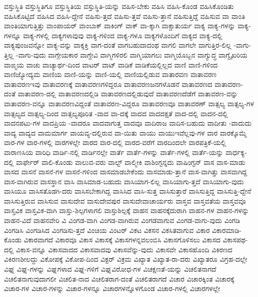{ವಸ್ತುಸ್ಥಿತಿ
ವಸ್ತುಸ್ಥಿತಿಗೂ
ವಸ್ತುಸ್ಥಿತಿಯ
ವಸ್ತುಸ್ಥಿತಿ-ಯನ್ನು
ವಹಿಸ-ಬೇಕು
ವಹಿಸಿ
ವಹಿಸಿ-ಕೊಂಡ
ವಹಿಸಿಕೊಂಡಿತು
ವಹಿಸಿಕೊಟ್ಟಿದೆ
ವಹಿಸಿದ
ವಹಿಸಿ-ದ್ದೇನೆ
ವಹಿಸು-ತ್ತದೆ
ವಹಿಸು-ತ್ತವೆ
ವಹಿಸು-ತ್ತಾನೆ
ವಹಿಸುತ್ತಿದ್ದೆ
ವಹಿಸುವ
ವಾ
ವಾಂತಿ
ವಾಂತಿಯಾಗುತ್ತಿತ್ತು
ವಾಂಪಾಯರ್
ವಾಂಬಾಕ್
ವಾಕಿಂಗ್
ವಾಕ್
ವಾ-ಕ್ಕಾಗಿ
ವಾಕ್ಚಾತುರ್ಯ
ವಾಕ್ಯ
ವಾಕ್ಯ-ಗಳನ್ನು
ವಾಕ್ಯ-ಗಳನ್ನೂ
ವಾಕ್ಯ-ಗಳಲ್ಲಿ
ವಾಕ್ಯಗಳಾವುವು
ವಾಕ್ಯ-ಗಳಿಂದ
ವಾಕ್ಯ-ಗಳೂ
ವಾಕ್ಯಗಳೊಂದಿಗೆ
ವಾಕ್ಯದ
ವಾಕ್ಯ-ದಲ್ಲಿ
ವಾಕ್ಯಪುಂಜವನ್ನೋ
ವಾಕ್ಯ-ವನ್ನು
ವಾಕ್ಶಕ್ತಿ
ವಾಗ-ದಂತೆ
ವಾಗಬಹುದಾದಂಥ
ವಾಗಲಿ
ವಾಗಲೇ
ವಾಗುತ್ತಿರ-ಲಿಲ್ಲ
-ವಾಗು-ತ್ತಿಲ್ಲ
-ವಾಗು-ವುದು
ವಾಗ್ಗೇಯಕಾರ
ವಾಗ್ದೇವಿ
ವಾಗ್ಮಿಗಳಿರಲಿ
ವಾಗ್ಮಿಯಾಗಲು
ವಾಗ್ಮಿಯೊಬ್ಬನ
ವಾಗ್ಯುದ್ಧ
ವಾಗ್ವೈಖರಿಯ
ವಾಙ್ಮಯ
ವಾಚು
ವಾಚ್ಯಾರ್ಥ-ದಿಂದ
ವಾಟರ್
ವಾಟ್
ವಾಡಿಕೆ
ವಾಡಿಕೆಯಲ್ಲಿಲ್ಲದ
ವಾಣಿ
ವಾಣಿ-ಗಳಿಂದ
ವಾಣಿಜ್ಯೋದ್ಯಮ
ವಾಣಿಯ
ವಾಣಿ-ಯನ್ನು
ವಾಣಿ-ಯಲ್ಲಿ
ವಾಣಿಯಲ್ಲಿಡುವ
ವಾತಾರವಣ
ವಾತಾವರಣ
ವಾತಾವರಣಇವು
ವಾತಾವರಣಕ್ಕೆ
ವಾತಾವರಣಗಳಿದ್ದರೂ
ವಾತಾವರಣಜನಗಳೊಡನೆ
ವಾತಾವರಣದ
ವಾತಾವರಣ-ದಂತೆ
ವಾತಾವರಣ-ದಲ್ಲಿ
ವಾತಾವರಣದಲ್ಲಿಡಿ
ವಾತಾವರಣದಲ್ಲಿಡುವುದೆ
ವಾತಾವರಣದೆಡೆಗೆ
ವಾತಾವರಣ-ವನ್ನು
ವಾತಾವರಣ-ವನ್ನೂ
ವಾತಾವರಣವಿದ್ದಂತೆ
ವಾತಾವರಣ-ವಿದ್ದರೂ
ವಾತಾವರಣವೂ
ವಾತಾವರಣ್
ವಾತ್ಸಲ್ಯ
ವಾತ್ಸಲ್ಯ-ಗಳ
ವಾತ್ಸಲ್ಯದ
ವಾತ್ಸಲ್ಯ-ದಿಂದ
ವಾತ್ಸಲ್ಯಪೂರಿತ
-ವಾದ
ವಾ-ದಕ್ಕೆ
ವಾದದ
ವಾದದಕ್ಷತೆ
ವಾದ-ದಲ್ಲಿ
ವಾದನ-ದಲ್ಲಿ
ವಾದನಪಟು-ಗಳ
ವಾದಪ್ರಿಯ
-ವಾದರೂ
ವಾದವಾಗುತ್ತ
ವಾದವೂ
ವಾದಿರಾಜ
ವಾದಿಸ-ಬಹುದು
ವಾದೀತು
-ವಾದುದು
ವಾದ್ಯ
ವಾದ್ಯದ
ವಾಮಮಾರ್ಗ
ವಾಯವ್ಯ-ದಲ್ಲಿರುವ
ವಾ-ಯಿತು
ವಾಯು
ವಾಯುಇವೆಲ್ಲವು-ಗಳ
ವಾರ
ವಾರಕ್ಕೊಮ್ಮೆ
ವಾರ-ಗಳ
ವಾರ-ಗಳಲ್ಲಿ
ವಾರಗಳಲ್ಲೇ
ವಾರದ
ವಾರ-ದಲ್ಲಿ
ವಾರದ-ವರೆಗೆ
ವಾರದಿಂದಲೇ
ವಾರಪತ್ರಿಕೆ-ಯಲ್ಲಿ
ವಾರಾಣಸಿಯ
ವಾರಿಧಿ
ವಾರ್ಡಿ-ನಲ್ಲಿ
ವಾರ್ಡಿನಲ್ಲೇ
ವಾರ್ತೆ
ವಾರ್ತೆ-ಗಳನ್ನು
ವಾರ್ತೆ-ಗಳಲ್ಲಿ
ವಾರ್ತೆ-ಯನ್ನು
ವಾರ್ಧಕ್ಯ-ದಲ್ಲಿ
ವಾರ್ಫೇರ್
ವಾಲಿ-ಕೊಂಡು
ವಾಲುವ-ವರು
ವಾಲ್ಟ್
ವಾಲ್ಮೀಕಿ
ವಾಶಿಂಗ್ಟನ್ನದು
ವಾಷಿಂಗ್ಟನ್
ವಾಸ
ವಾಸ-ಮಾಡು
ವಾಸದ
ವಾಸನೆ
ವಾಸನೆ-ಗಳ
ವಾಸನೆ-ಗಳಿಂದ
ವಾಸಮಾಡಬೇಕೆಂದು
ವಾಸಮಾಡು-ತ್ತಾನೆ
ವಾಸ-ವಾಗಿತ್ತು
ವಾಸವಾಗಿದ್ದ
ವಾಸ-ವಾಗಿರುವ
ವಾಸಸ್ಥಾನ
ವಾಸಿ
ವಾಸಿಮಾಡ-ಬಹುದು
ವಾಸಿಯಾಗ-ಲಿಲ್ಲ
ವಾಸಿಯಾಗು-ತ್ತದೆ
ವಾಸಿಯಾಗು-ವುದು
ವಾಸಿಯೂ
ವಾಸಿಸತೊಡಗಿ-ದರು
ವಾಸಿಸಬೇಕಾಗಿದ್ದ
ವಾಸಿಸಿದ
ವಾಸಿ-ಸುತ್ತ
ವಾಸಿಸುತ್ತಾರೆ
ವಾಸಿಸುತ್ತಿದ್ದ
ವಾಸಿಸುತ್ತಿ-ದ್ದೇನೆ
ವಾಸಿಸುತ್ತಿರುವ
ವಾಸಿಸುವ
ವಾಸುದೇವ
ವಾಸುದೇವಪುರ
ವಾಸುದೇವಾಚಾರ್ಯರು
ವಾಸ್ತವ
ವಾಸ್ತವತೆಯ
ವಾಸ್ತವವೂ
ವಾಸ್ತವಿಕ
ವಾಸ್ತವಿಕ-ವಾಗಿ
ವಾಸ್ತು-ಶಿಲ್ಪಗಳಾಗಲಿ
ವಾಸ್ತುಶಿಲ್ಪಕ್ಕೆ
ವಾಹನ
ವಾಹನಕ್ಕೆದುರಾಗಿ
ವಾಹನ-ಗಳ
ವಾಹನ-ಗಳನ್ನು
ವಾಹನ-ವಿದೆ
ವಾಹನವೇರಿ
ವಿ
ವಿಂಗಡ-ವಾಗಿ
ವಿಂಗಡ-ವಾಗಿರುವ
ವಿಂಗಡವಾಗುವ
ವಿಂಗಡ-ವಾಗು-ವುದು
ವಿಂಗಡಿ
ವಿಂಗಡಿಸಿ
ವಿಂಗಡಿಸಿದ
ವಿಂಗಡಿಸು-ತ್ತದೆ
ವಿಂಚಿಯ
ವಿಂಟರ್
ವಿಕಟ
ವಿಕಸನ
ವಿಕಸಿತವಾಗುವ
ವಿಕಾರ
ವಿಕಾರಮಾಡಿ-ಕೊಂಡು
ವಿಕಾರವಾಗದೆ
ವಿಕಾರವೂ
ವಿಕಾಸ
ವಿಕಾಸಕ್ಕೆ
ವಿಕಾಸಗಳನ್ನವಲಂಬಿಸಿ
ವಿಕಾಸಗೊಳಿಸಲು
ವಿಕಾಸದ
ವಿಕಾಸಪಥ-ದಲ್ಲಿ
ವಿಕಾಸ-ವನ್ನೂ
ವಿಕಾಸವಾದದ
ವಿಕಾಸವಾದವು
ವಿಕಾಸವೆನ್ನು-ವುದು
ವಿಕಾಸವೇ
ವಿಕಾಸಹೊಂದಿ
ವಿಕಿರಣದ
ವಿಕಿರಣಶೀಲದ್ದು
ವಿಕೋಪಕ್ಕೆ
ವಿಕೋಪ-ದಿಂದ
ವಿಕ್ಟರ್
ವಿಕ್ರಮ
ವಿಖ್ಯಾತ
ವಿಖ್ಯಾತ-ರಾ-ದರು
ವಿಖ್ಯಾತರೂ
ವಿಗ್ರಹ-ದಲ್ಲೇ
ವಿಘ್ನ
ವಿಘ್ನ-ಗಳನ್ನು
ವಿಘ್ನಗಳಾದ
ವಿಘ್ನ-ಗಳಿಗೆ
ವಿಘ್ನವಿರೋಧ-ಗಳ
ವಿಚಕ್ಷಣತೆ-ಯನ್ನು
ವಿಚಲಿತನಾಗದೆ
ವಿಚಲಿತನಾಗುವುದಾಗಲೀ
ವಿಚಲಿತ-ನಾದ
ವಿಚಲಿತರಾಗ-ದಂತೆ
ವಿಚಲಿತರಾಗದೆ
ವಿಚಾರ
ವಿಚಾರಕ್ಕಿಂತ
ವಿಚಾರಕ್ಕೆ
ವಿಚಾರ-ಗಳ
ವಿಚಾರ-ಗಳನ್ನು
ವಿಚಾರ-ಗಳನ್ನೂ
ವಿಚಾರಗಳನ್ನೊಳಗೊಂಡ
ವಿಚಾರ-ಗಳಲ್ಲಿ
ವಿಚಾರಗಳಲ್ಲೇ
}
